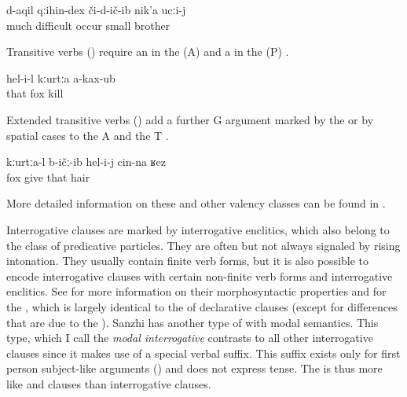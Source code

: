 \begin{exe}
	\ex	\label{ex:‎‎‎The little brother experienced many difficulties}
	\gll	d-aqil	qːihin-dex	či-d-ič-ib	nik'a	ucːi-j\\
		much	difficult	occur	small	brother\\
	\glt	{}
\end{exe}

Transitive verbs () require an  in the  (A) and a  in the  (P) . 

\begin{exe}
	\ex	\label{ex:He did not kill the fox}
	\gll	hel-i-l	kːurtːa a-kax-ub\\
		that	fox kill\\
	\glt	{}
\end{exe}

Extended transitive verbs () add a further G argument marked by the  or by spatial cases to the  A and the  T .

\begin{exe}
	\ex	\label{ex:The fox gave him his hair}
	\gll	kːurtːa-l	b-ičː-ib	hel-i-j	cin-na	ʁez\\
		fox	give	that		hair\\
	\glt	{}
\end{exe}

More detailed information on these and other valency classes can be found in .

Interrogative clauses are marked by interrogative enclitics, which also belong to the class of predicative particles. They are often but not always signaled by rising intonation. They usually contain finite verb forms, but it is also possible to encode interrogative clauses with certain non-finite verb forms and interrogative enclitics. See  for more information on their morphosyntactic properties and  for the , which is largely identical to the  of declarative clauses (except for differences that are due to the ). Sanzhi has another type of  with modal semantics. This type, which I call the \textit{modal interrogative} contrasts to all other interrogative clauses since it makes use of a special verbal suffix. This suffix exists only for first person subject-like arguments () and does not express tense. The  is thus more like  and  clauses than interrogative clauses. 

